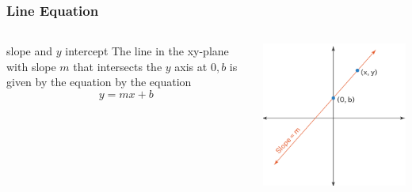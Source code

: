 \documentclass{beamer}
\begin{document}
\begin{frame}
  \frametitle{Line Equation}
  \begin{columns} 
  \begin{alertblock}{slope and \(y\) intercept}
    The line in the xy-plane with slope \(m\) that intersects the \(y\) axis at \(0,b\) is given by the equation 
by the equation 
\[y = mx+b\]
  \end{alertblock}

  \centering
  \includegraphics[width=0.8\linewidth]{line2.png} %
  \end{columns}

\end{frame}
\end{document}
